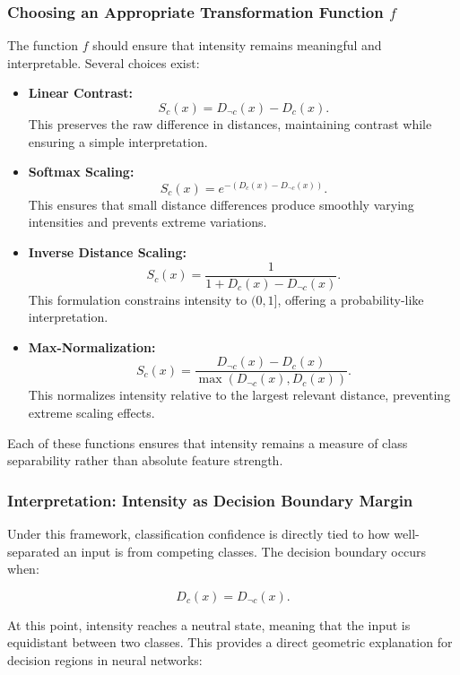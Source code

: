 \subsubsection{Choosing an Appropriate Transformation Function \( f \)}

The function \( f \) should ensure that intensity remains meaningful and interpretable. Several choices exist:

\begin{itemize}
    \item \textbf{Linear Contrast:}  
    \[
    S_c(x) = D_{\neg c}(x) - D_c(x).
    \]
    This preserves the raw difference in distances, maintaining contrast while ensuring a simple interpretation.
    
    \item \textbf{Softmax Scaling:}  
    \[
    S_c(x) = e^{-(D_c(x) - D_{\neg c}(x))}.
    \]
    This ensures that small distance differences produce smoothly varying intensities and prevents extreme variations.
    
    \item \textbf{Inverse Distance Scaling:}  
    \[
    S_c(x) = \frac{1}{1 + D_c(x) - D_{\neg c}(x)}.
    \]
    This formulation constrains intensity to \( (0,1] \), offering a probability-like interpretation.
    
    \item \textbf{Max-Normalization:}  
    \[
    S_c(x) = \frac{D_{\neg c}(x) - D_c(x)}{\max(D_{\neg c}(x), D_c(x))}.
    \]
    This normalizes intensity relative to the largest relevant distance, preventing extreme scaling effects.
\end{itemize}


Each of these functions ensures that intensity remains a measure of class separability rather than absolute feature strength.

\subsubsection{Interpretation: Intensity as Decision Boundary Margin}

Under this framework, classification confidence is directly tied to how well-separated an input is from competing classes. The decision boundary occurs when:

\[
D_c(x) = D_{\neg c}(x).
\]

At this point, intensity reaches a neutral state, meaning that the input is equidistant between two classes. This provides a direct geometric explanation for decision regions in neural networks: 

